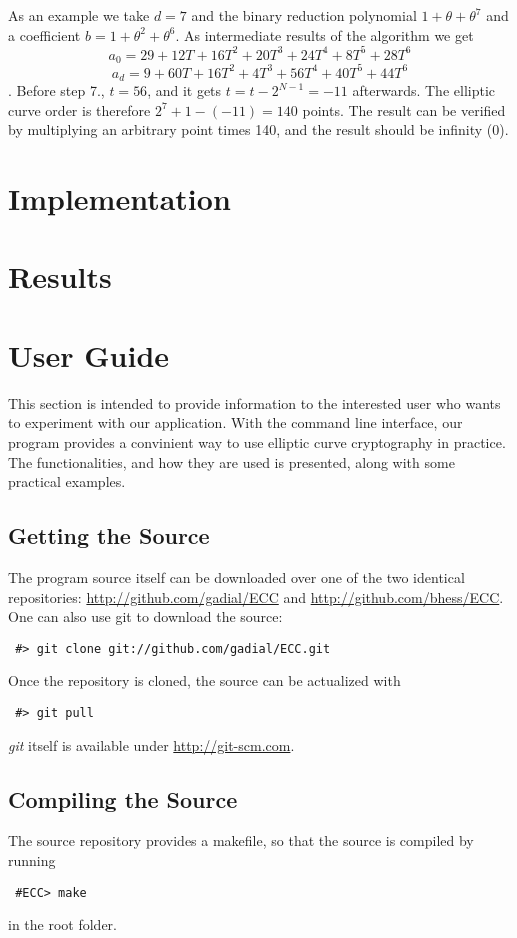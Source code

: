 \documentclass[11pt,english]{article}
\begin{document}
As an example we take $d=7$ and the binary reduction polynomial $1+\theta+\theta^7$ and a coefficient $b=1+\theta^2+\theta^6$. As intermediate results of the algorithm we get 
\begin{displaymath}a_0=29+12T+16T^2+20T^3+24T^4+8T^5+28T^6\end{displaymath}
\begin{displaymath}a_d=9+60T+16T^2+4T^3+56T^4+40T^5+44T^6\end{displaymath}.
Before step 7., $t=56$, and it gets $t=t-2^{N-1}=-11$ afterwards. The elliptic curve order is therefore $2^7+1-(-11)=140$ points. The result can be verified by multiplying an arbitrary point times 140, and the result should be infinity ($0$).

\section{Implementation}
\section{Results}

\section{User Guide}
This section is intended to provide information to the interested user who wants to experiment with our application.
With the command line interface, our program provides a convinient way to use elliptic curve cryptography in practice. The functionalities, and how they are used is presented, along with some practical examples.

\subsection{Getting the Source}
The program source itself can be downloaded over one of the two identical repositories: \url{http://github.com/gadial/ECC} and \url{http://github.com/bhess/ECC}. One can also use git to download the source:
\begin{verbatim}
 #> git clone git://github.com/gadial/ECC.git
\end{verbatim}
Once the repository is cloned, the source can be actualized with
\begin{verbatim}
 #> git pull
\end{verbatim}
\emph{git} itself is available under \url{http://git-scm.com}.

\subsection{Compiling the Source}
The source repository provides a makefile, so that the source is compiled by running
\begin{verbatim}
 #ECC> make
\end{verbatim}
in the root folder.
\end{document}
